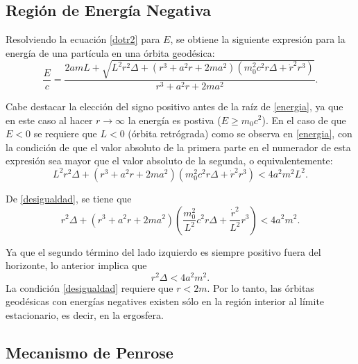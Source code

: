 \subsection{Región de Energía Negativa}

Resolviendo la ecuación \eqref{dotr2} para $E$, se obtiene la siguiente expresión para la energía de una partícula en una órbita geodésica:
\begin{equation}\label{energia}
\frac{E}{c}=\frac{2amL+\sqrt{L^2r^2\Delta+\left(r^3+a^2r+2ma^2\right)\left(m_0^2c^2r\Delta+\dot{r}^2r^3\right)}}{r^3+a^2r+2ma^2}.
\end{equation}

Cabe destacar la elección del signo positivo antes de la raíz de \eqref{energia}, ya que en este caso al hacer $r\rightarrow \infty$ la energía es postiva ($E \geq m_0c^2$). En el caso de que $E<0$ se requiere que $L<0$ (órbita retrógrada) como se observa en \eqref{energia}, con la condición de que el valor absoluto de la primera parte en el numerador de esta expresión sea mayor que el valor absoluto de la segunda, o equivalentemente:
\begin{equation}\label{desigualdad}
L^2r^2\Delta+\left(r^3+a^2r+2ma^2\right)\left(m_0^2c^2r\Delta+\dot{r}^2r^3\right) < 4a^2m^2L^2.
\end{equation}

De \eqref{desigualdad}, se tiene que
\begin{equation}\label{desigualdad2}
r^2 \Delta +\left(r^3+a^2r+2ma^2\right)\left(\frac{m_0^2}{L^2}c^2r\Delta+\frac{\dot{r}^2}{L^2}r^3\right) < 4a^2m^2.
\end{equation}

Ya que el segundo término del lado izquierdo es siempre positivo fuera del horizonte, lo anterior implica que
\begin{equation}\label{desigualdad3}
r^2 \Delta < 4a^2m^2.
\end{equation}
La condición \eqref{desigualdad} requiere que $r<2m$. Por lo tanto, las órbitas geodésicas con energías negatives existen sólo en la región interior al límite estacionario, es decir, en la ergosfera.

\subsection{Mecanismo de Penrose}

